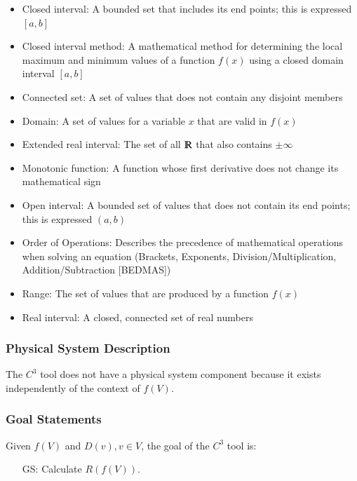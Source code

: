 \documentclass[12pt]{article}
\newcounter{goalnum} %
\newcommand{\prognameAbbrv}{$C^{3}$}
\begin{document}
\begin{itemize}

\item Closed interval: A bounded set that includes its end points; this is 
expressed $[a,b]$
\item Closed interval method: A mathematical method for determining the local 
maximum and minimum values of a function $f(x)$ using a closed domain interval 
$[a,b]$
\item Connected set: A set of values that does not contain any disjoint members
\item Domain: A set of values for a variable $x$ that are valid in $f(x)$
\item Extended real interval: The set of all $\varmathbb{R}$ that also contains 
$\pm \infty$
\item Monotonic function: A function whose first derivative does not change its 
mathematical sign
\item Open interval: A bounded set of values that does not contain its end 
points; this is expressed $(a,b)$
\item Order of Operations: Describes the precedence of mathematical operations 
when solving an equation (Brackets, Exponents, Division/Multiplication, 
Addition/Subtraction [BEDMAS])
\item Range: The set of values that are produced by a function $f(x)$
\item Real interval: A closed, connected set of real numbers

\end{itemize}

\subsubsection{Physical System Description}

The \prognameAbbrv{} tool does not have a physical system component because it 
exists independently of the context of $f(V)$. 

\subsubsection{Goal Statements}

\noindent Given $f(V)$ and $D(v), v \in V$, the goal of the \prognameAbbrv{} 
tool is:

\begin{itemize}

\item[GS\refstepcounter{goalnum}\thegoalnum \label{G_range}:] 
Calculate $R(f(V))$.



\end{itemize}
\end{document}
